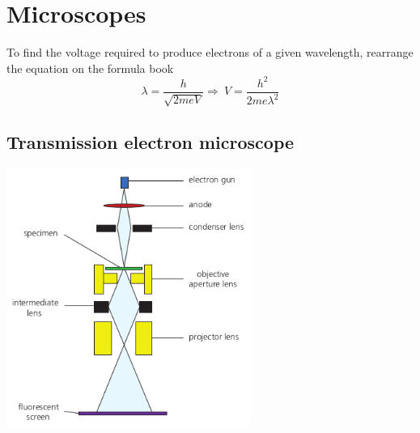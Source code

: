 \documentclass[12pt]{article}
\begin{document}
\section{Microscopes}
To find the voltage required to produce electrons of a given wavelength, rearrange the equation on the formula book
$$\lambda=\frac{h}{\sqrt{2meV}}\Rightarrow \ V=\frac{h^2}{2me\lambda^2}$$
\subsection{Transmission electron microscope}
\includegraphics[width=8cm]{tem.png}
\end{document}
